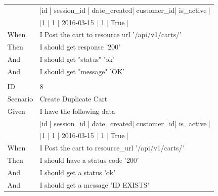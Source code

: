 \documentclass{report}
\begin{document}
\begin{tabular}{ l l }
    			& |id | session\_id | date\_created| customer\_id| is\_active | \\
    			& |1  | 1          | 2016-03-15  | 1          | True      |\\
When 		& I Post the cart to resource url  '/api/v1/carts/' \\
Then 		& I should get response '200' \\
And 			& I should get "status" 'ok'\\
And 			& I should get "message" 'OK' \\ \\
ID 			& 8 \\
Scenario		& Create Duplicate Cart \\
Given 		& I have the following data \\
    			& |id | session\_id | date\_created| customer\_id| is\_active | \\
 			& |1  | 1          | 2016-03-15  | 1          | True      |\\
When 		& I Post the cart to resource\_url  '/api/v1/carts/' \\
Then 		& I should have a status code '200' \\
And			& I should get a status 'ok' \\
And 			& I should get a message 'ID EXISTS' 
\end{tabular}
\newpage
\end{document}
